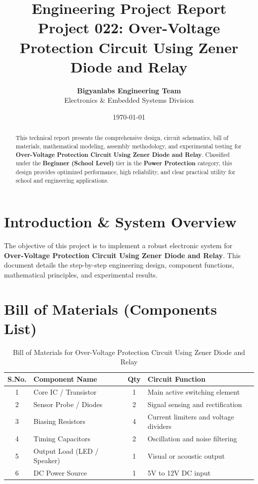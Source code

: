 \documentclass[11pt,a4paper]{article}
\title{\textbf{\Huge Engineering Project Report}\\[0.5em] \Large Project 022: Over-Voltage Protection Circuit Using Zener Diode and Relay}
\author{\textbf{Bigyanlabs Engineering Team}\\ Electronics \& Embedded Systems Division}
\date{\today}
\begin{document}
\maketitle
\thispagestyle{empty}

\begin{abstract}
This technical report presents the comprehensive design, circuit schematics, bill of materials, mathematical modeling, assembly methodology, and experimental testing for \textbf{Over-Voltage Protection Circuit Using Zener Diode and Relay}. Classified under the \textbf{Beginner (School Level)} tier in the \textbf{Power Protection} category, this design provides optimized performance, high reliability, and clear practical utility for school and engineering applications.
\end{abstract}

\newpage
\tableofcontents
\newpage

\section{Introduction \& System Overview}
The objective of this project is to implement a robust electronic system for \textbf{Over-Voltage Protection Circuit Using Zener Diode and Relay}. This document details the step-by-step engineering design, component functions, mathematical principles, and experimental results.

\section{Bill of Materials (Components List)}
\begin{table}[h!]
\centering
\caption{Bill of Materials for Over-Voltage Protection Circuit Using Zener Diode and Relay}
\vspace{0.5em}
\begin{tabular}{clcp{7cm}}
\toprule
\textbf{S.No.} & \textbf{Component Name} & \textbf{Qty} & \textbf{Circuit Function} \\
\midrule
1 & Core IC / Transistor & 1 & Main active switching element \\
2 & Sensor Probe / Diodes & 2 & Signal sensing and rectification \\
3 & Biasing Resistors & 4 & Current limiters and voltage dividers \\
4 & Timing Capacitors & 2 & Oscillation and noise filtering \\
5 & Output Load (LED / Speaker) & 1 & Visual or acoustic output \\
6 & DC Power Source & 1 & 5V to 12V DC input \\
\bottomrule
\end{tabular}
\end{table}
\end{document}
